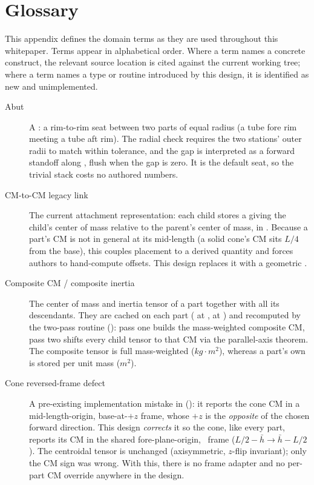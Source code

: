 \section{Glossary}\label{sec:glossary}

This appendix defines the domain terms as they are used throughout this whitepaper.
Terms appear in alphabetical order. Where a term names a concrete construct, the
relevant source location is cited against the current working tree; where a term names
a type or routine introduced by this design, it is identified as new and unimplemented.

\begin{description}

\item[Abut] A  : a rim-to-rim seat between two parts of
  equal radius (a tube fore rim meeting a tube aft rim). The radial check requires the
  two stations' outer radii to match within tolerance, and the gap is interpreted as a
  forward standoff along \zfwd, flush when the gap is zero. It is the default seat, so
  the trivial stack costs no authored numbers.

\item[CM-to-CM legacy link] The current attachment representation: each child stores a
   giving the child's center of mass relative to the parent's center of
  mass, in . Because a part's CM is not in general at its
  mid-length (a solid cone's CM sits $L/4$ from the base), this couples placement to a
  derived quantity and forces authors to hand-compute offsets. This design replaces it
  with a geometric .

\item[Composite CM / composite inertia] The center of mass and inertia tensor of a part
  together with all its descendants. They are cached on each part ( at
  ,  at
  ) and recomputed by the
  two-pass routine  (): pass one
  builds the mass-weighted composite CM, pass two shifts every child tensor to that CM via
  the parallel-axis theorem. The composite tensor is full mass-weighted ($\unit{kg\cdot m^2}$),
  whereas a part's own  is stored per unit mass ($\unit{m^2}$).

\item[Cone reversed-frame defect] A pre-existing implementation mistake in
   (): it reports the cone CM in a
  mid-length-origin, base-at-$+z$ frame, whose $+z$ is the \emph{opposite} of the chosen forward
  direction. This design \emph{corrects} it so the cone, like every part, reports its CM in the
  shared fore-plane-origin, \zfwd\ frame ($L/2 - \bar h \rightarrow \bar h - L/2$). The centroidal
  tensor is unchanged (axisymmetric, $z$-flip invariant); only the CM sign was wrong. With this,
  there is no frame adapter and no per-part CM override anywhere in the design.


\end{description}
